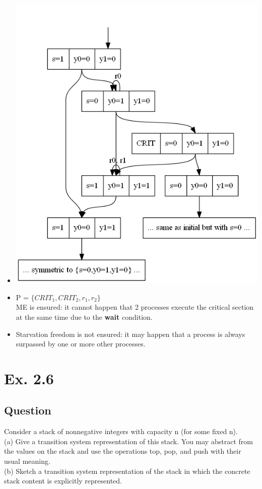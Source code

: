 \documentclass[12pt]{article}
\begin{document}
\begin{itemize}
	\item \begin{centering}
		\includegraphics*[scale=0.5]{25c.png}
	\end{centering}
	\item P = $\{CRIT_1, CRIT_2, r_1, r_2\}$\\
		ME is ensured: it cannot happen that 2 processes execute the critical section at the same time due to the \textbf{wait} condition.
	\item Starvation freedom is not ensured: it may happen that a process is always surpassed by one or more other processes.
\end{itemize}

\newpage
\section*{Ex. 2.6}
\subsection*{Question}
Consider a stack of nonnegative integers with capacity n (for some fixed n).\\
(a) Give a transition system representation of this stack. You may abstract from the values on
the stack and use the operations top, pop, and push with their usual meaning.\\
(b) Sketch a transition system representation of the stack in which the concrete stack content is
explicitly represented.
\end{document}
